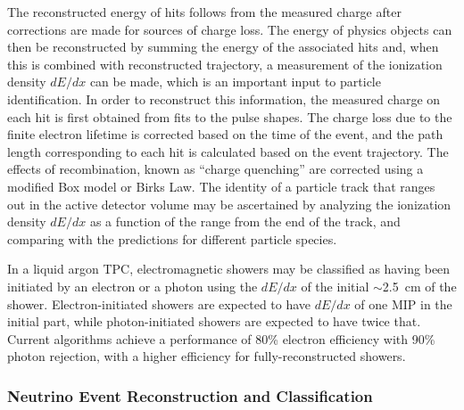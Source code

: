 The reconstructed energy of hits follows from the measured charge
after corrections are made for sources of charge loss.  The energy of
physics objects can then be reconstructed by summing the energy of the
associated hits and, when this is combined with reconstructed
trajectory, a measurement of the ionization density $dE/dx$ can be
made, which is an important input to particle identification.  In
order to reconstruct this information, the measured charge on each hit
is first obtained from fits to the pulse shapes.  The charge loss due
to the finite electron lifetime is corrected based on the time of the
event, and the path length corresponding to each hit is calculated
based on the event trajectory.  The effects of recombination, known as
``charge quenching'' are corrected using a modified Box
model\cite{Thomas:1987zz} or Birks Law\cite{Birks:1964zz}.  The
identity of a particle track that ranges out in the active detector
volume may be ascertained by analyzing the ionization density $dE/dx$
as a function of the range from the end of the track, and comparing
with the predictions for different particle species.

In a liquid argon TPC, electromagnetic showers may be classified as
having been initiated by an electron or a photon using the $dE/dx$ of
the initial $\sim$2.5~cm of the shower.  Electron-initiated showers
are expected to have $dE/dx$ of one MIP in the initial part, while
photon-initiated showers are expected to have twice that.  Current
algorithms achieve a performance of 80\% electron efficiency with 90\%
photon rejection, with a higher efficiency for fully-reconstructed
showers.



\subsubsection{Neutrino Event Reconstruction and Classification}

